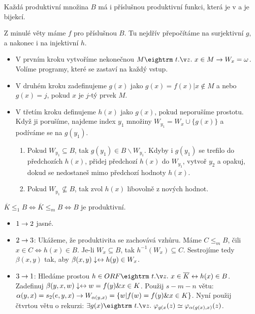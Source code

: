\begin{multicols}{3}
Každá produktivní množina $B$ má i příslušnou produktivní funkci, která je v \ORF a je bijekcí.

\prf{} Z minulé věty máme \ORF $f$ pro příslušnou $B$. Tu nejdřív přepočítáme na surjektivní $g$,
a nakonec i na injektivní $h$.

\begin{itemize}
\item V prvním kroku vytvoříme nekonečnou $M \st x \in M \then W_x = \omega$. Volíme programy, které
se zastaví na každý vstup.
\item V druhém kroku zadefinujeme $g(x)$ jako $g(x) = f(x) | x \not \in M$ a nebo $g(x) = j$, pokud $x$ je $j$-tý
prvek $M$. 
\item V třetím kroku definujeme $h(x)$ jako $g(x)$, pokud neporušíme prostotu. Když ji porušíme, najdeme index
$y_1$ množiny $W_{y_1} = W_x \cup \{g(x)\}$ a podíváme se na $g(y_1)$. 

\begin{enumerate}
\item Pokud $W_{y_1} \subseteq B$, tak $g(y_1) \in B \backslash W_{y_1}$. Kdyby i $g(y_1)$ se trefilo do předchozích $h(x)$, přidej předchozí $h(x)$ do $W_{y_1}$, vytvoř $y_2$ a opakuj, dokud se nedostaneš mimo předchozí hodnoty $h(x)$.
\item Pokud $W_{y_1} \not \subseteq B$, tak zvol $h(x)$ libovolně z nových hodnot.
\end{enumerate}
\end{itemize}

 $\overline{K} \le_1 B \iff \overline{K} \le_m B \iff B$ je produktivní.

\prf{}
\begin{itemize}
\item $1 \rightarrow 2$ jasné.
\item $2 \rightarrow 3$: Ukážeme, že produktivita se zachovává vzhůru. Máme $C \le_m B$, čili
$x \in C \iff h(x) \in B$. Je-li $W_x \subseteq B$, tak $h^{-1}(W_x) \subseteq C$. Sestrojíme
tedy $\beta(x,y)$ tak, aby $\beta(x,y)\downarrow \leftrightarrow h(y) \in W_x$.
\item $3 \rightarrow 1$: Hledáme prostou $h \in ORF \st x \in \overline{K} \iff h(x) \in B$.
Zadefinuj $\beta(y,x,w) \downarrow \leftrightarrow w = f(y) \& x \in K$. Použij $s-m-n$ větu: $\alpha(y,x) = s_2(e,y,x) \rightarrow 
W_{\alpha(y,x)} = \{ w | f(w) = f(y) \& x \in K \}$. 
Nyní použij čtvrtou větu o rekurzi: $\exists g(x) \st \varphi_{g(x}(z) \simeq \varphi_{\alpha(g(x),x)}(z)$.
\end{itemize}


\end{multicols}
